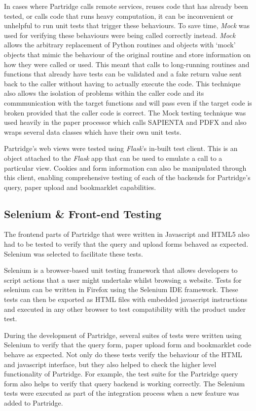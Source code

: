 In cases where Partridge calls remote services, reuses code that has already
been tested, or calls code that runs heavy computation, it can be inconvenient
or unhelpful to run unit tests that trigger these behaviours. To save time,
\emph{Mock}\cite{mock2013} was used for verifying these behaviours were being
called correctly instead.  \emph{Mock} allows the arbitrary replacement of
Python routines and objects with `mock' objects that mimic the behaviour of the
original routine and store information on how they were called or used. This
meant that calls to long-running routines and functions that already have tests
can be validated and a fake return value sent back to the caller without
having to actually execute the code. This technique also allows the isolation
of problems within the caller code and its commmunication with the target
functions and will pass even if the target code is broken provided that the
caller code is correct\cite{saff2004mock}. The Mock testing technique was used
heavily in the paper processor which calls SAPIENTA and PDFX and also wraps
several data classes which have their own unit tests.

Partridge's web views were tested using \emph{Flask}'s in-built test client.
This is an object attached to the \emph{Flask} app that can be used to emulate
a call to a particular view\cite{flask2012}. Cookies and form information can also be
manipulated through this client, enabling comprehensive testing of each of the backends
for Partridge's query, paper upload and bookmarklet capabilities.


\subsection{ Selenium \& Front-end Testing }

The frontend parts of Partridge that were written in Javascript and HTML5 also
had to be tested to verify that the query and upload forms behaved as expected.
Selenium\cite{seleniumide} was selected to facilitate these tests.

Selenium is a browser-based unit testing framework that allows developers to
script actions that a user might undertake whilst browsing a website. Tests for
selenium can be written in Firefox using the Selenium IDE framework. These
tests can then be exported as HTML files with embedded javascript instructions
and executed in any other browser to test compatibility with the product under
test.

During the development of Partridge, several suites of tests were written using
Selenium to verify that the query form, paper upload form and bookmarklet code
behave as expected. Not only do these tests verify the behaviour of the HTML
and javascript interface, but they also helped to check the higher level
functionality of Partridge. For example, the test suite for the Partridge query
form also helps to verify that query backend is working correctly. The Selenium
tests were executed as part of the integration process when a new feature was
added to Partridge.



